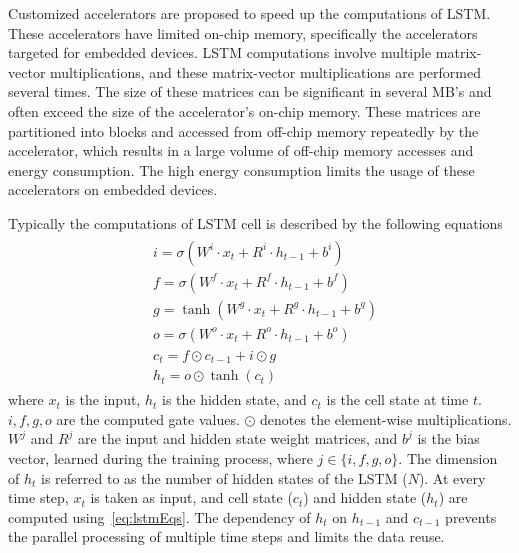 \documentclass[a4paper,10pt]{article}
\begin{document}
Customized accelerators are proposed to speed up the computations of LSTM. These accelerators have limited on-chip memory, specifically the accelerators targeted for embedded devices. LSTM computations involve multiple matrix-vector multiplications, and these matrix-vector multiplications are performed several times. The size of these matrices can be significant in several MB's and often exceed the size of the accelerator's on-chip memory. These matrices are partitioned into blocks and accessed from off-chip memory repeatedly by the accelerator, which results in a large volume of off-chip memory accesses and energy consumption. The high energy consumption limits the usage of these accelerators on embedded devices.

Typically the computations of LSTM cell is described by the following equations
\begin{align}\label{eq:lstmEqs}
	\begin{split}
		&i{=}{\sigma}(W^i{\cdot}x_t{+}R^i{\cdot}h_{t-1}{+}b^i)\\
		&f{=}{\sigma}(W^f{\cdot}x_t{+}R^f{\cdot}h_{t-1}{+}b^f)\\
		&g{=}{\tanh}(W^g{\cdot}x_t{+}R^g{\cdot}h_{t-1}{+}b^g)\\
		&o{=}{\sigma}(W^o{\cdot}x_t{+}R^o{\cdot}h_{t-1}{+}b^o)\\
		&c_{t}{=}f{\odot}c_{t-1}{+}i{\odot}g\\
		&h_{t}{=}o{\odot}{\tanh}(c_t)
	\end{split}	
\end{align}
where $x_t$ is the input, $h_t$ is the hidden state, and $c_t$ is the cell state at time $t$. $i,f,g,o$ are the computed gate values. $\odot$ denotes the element-wise multiplications. $W^j$ and $R^j$ are the input and hidden state weight matrices, and $b^j$ is the bias vector, learned during the training process, where $j\in\{i,f,g,o\}$. The dimension of $h_t$ is referred to as the number of hidden states of the LSTM ($N$). 
At every time step, $x_t$ is taken as input, and cell state ($c_t$) and hidden state ($h_t$) are computed using~\eqref{eq:lstmEqs}. The dependency of $h_t$ on $h_{t-1}$ and $c_{t-1}$ prevents the parallel processing of multiple time steps and limits the data reuse. 
\end{document}
